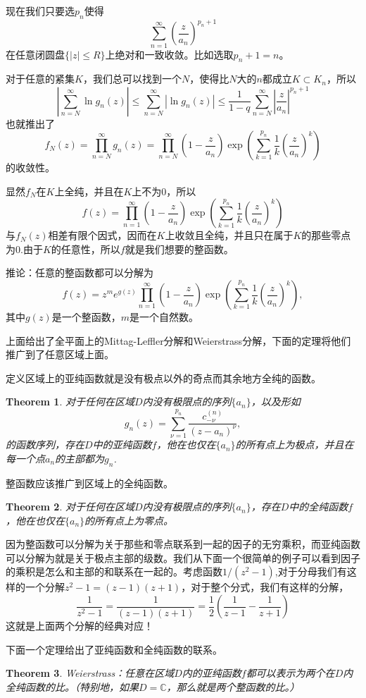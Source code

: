\documentclass[10pt]{book}
\theoremstyle{plain}%
\newtheorem{theo}{Theorem}[chapter]%
\begin{document}
现在我们只要选$p_n$使得
\[
\sum_{n=1}^\infty\left(\frac{z}{a_n}\right)^{p_n+1}
\]
在任意闭圆盘$\{|z|\leq R\}$上绝对和一致收敛。比如选取$p_n+1=n$。

对于任意的紧集$K$，我们总可以找到一个$N$，使得比$N$大的$n$都成立$K \subset K_n$，所以
\[
\left|\sum_{n=N}^\infty\ln g_n(z)\right|\leq \sum_{n=N}^\infty|\ln g_n(z)|\leq \frac{1}{1-q}\sum_{n=N}^\infty\left|\frac{z}{a_n}\right|^{p_n+1}
\]
也就推出了
\[
f_N(z)=\prod_{n=N}^\infty  g_n(z)=\prod_{n=N}^\infty  \left(1-\frac{z}{a_n}\right)\exp\left(\sum_{k=1}^{p_n}\frac{1}{k}\left(\frac{z}{a_n}\right)^k\right)
\]
的收敛性。

显然$f_N$在$K$上全纯，并且在$K$上不为0，所以
\[
f(z)=\prod_{n=1}^\infty  \left(1-\frac{z}{a_n}\right)\exp\left(\sum_{k=1}^{p_n}\frac{1}{k}\left(\frac{z}{a_n}\right)^k\right)
\]
与$f_N(z)$相差有限个因式，因而在$K$上收敛且全纯，并且只在属于$K$的那些零点为0.由于$K$的任意性，所以$f$就是我们想要的整函数。

推论：任意的整函数都可以分解为
\[
f(z)=z^me^{g(z)}\prod_{n=1}^\infty  \left(1-\frac{z}{a_n}\right)\exp\left(\sum_{k=1}^{p_n}\frac{1}{k}\left(\frac{z}{a_n}\right)^k\right),
\]
其中$g(z)$是一个整函数，$m$是一个自然数。

上面给出了全平面上的Mittag-Leffler分解和Weierstrass分解，下面的定理将他们推广到了任意区域上面。

定义区域上的亚纯函数就是没有极点以外的奇点而其余地方全纯的函数。
\begin{theo}
对于任何在区域$D$内没有极限点的序列$\{a_n\}$，以及形如\[g_n(z)=\sum_{\nu=1}^{p_n}\frac{c^{(n)}_{-\nu}}{(z-a_n)^\nu},\]的函数序列，存在$D$中的亚纯函数$f$，他在也仅在$\{a_n\}$的所有点上为极点，并且在每一个点$a_n$的主部都为$g_n$.
\end{theo}
整函数应该推广到区域上的全纯函数。
\begin{theo}
对于任何在区域$D$内没有极限点的序列$\{a_n\}$，存在$D$中的全纯函数$f$，他在也仅在$\{a_n\}$的所有点上为零点。
\end{theo}

因为整函数可以分解为关于那些和零点联系到一起的因子的无穷乘积，而亚纯函数可以分解为就是关于极点主部的级数。我们从下面一个很简单的例子可以看到因子的乘积是怎么和主部的和联系在一起的。考虑函数$1/(z^2-1)$,对于分母我们有这样的一个分解$z^2-1=(z-1)(z+1)$，对于整个分式，我们有这样的分解，\[\frac{1}{z^2-1}=\frac{1}{(z-1)(z+1)}=\frac{1}{2}\left(\frac{1}{z-1}-\frac{1}{z+1}\right)\]这就是上面两个分解的经典对应！

下面一个定理给出了亚纯函数和全纯函数的联系。
\begin{theo}
Weierstrass：任意在区域$D$内的亚纯函数$f$都可以表示为两个在$D$内全纯函数的比。（特别地，如果$D=\mathbb{C}$，那么就是两个整函数的比。）
\end{theo}
\end{document}
